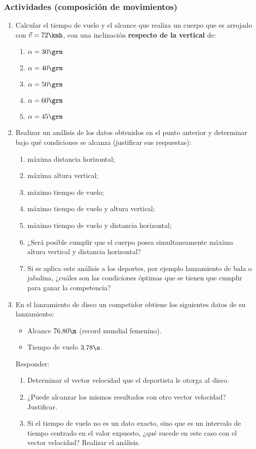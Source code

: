 \subsubsection*{Actividades (composición de movimientos)}
\small
\begin{enumerate}
  \item Calcular el tiempo de vuelo y el alcance que realiza un cuerpo que es
  arrojado con $\vec{v}=72\kmh$, con una inclinación {\bf respecto de la
  vertical} de:
    \begin{enumerate}
      \item $\alpha = 30\grm$
      \item $\alpha = 40\grm$
      \item $\alpha = 50\grm$
      \item $\alpha = 60\grm$
      \item $\alpha = 45\grm$
    \end{enumerate}
  \item Realizar un análisis de los datos obtenidos en el punto anterior y
  determinar bajo qué condiciones se alcanza (justificar sus respuestas):
    \begin{enumerate}
      \item máxima distancia horizontal;
      \item máxima altura vertical;
      \item máximo tiempo de vuelo;
      \item máximo tiempo de vuelo y altura vertical;
      \item máximo tiempo de vuelo y distancia horizontal;
      \item ¿Será posible cumplir que el cuerpo posea simultaneamente máxima
      altura vertical y distancia horizontal?
      \item Si se aplica este análisis a los deportes, por ejemplo lanzamiento
      de bala o jabalina, ¿cuáles son las condiciones óptimas que se tienen que
      cumplir para ganar la competencia?
    \end{enumerate}
  \item En el lanzamiento de disco un competidor obtiene los siguientes datos de
  su lanzamiento:
    \begin{itemize}
      \item Alcance $76.80\m$ (record mundial femenino).
      \item Tiempo de vuelo $3.78\s$.
    \end{itemize}
    Responder:
    \begin{enumerate}
    \item Determinar el vector velocidad que el deportista le otorga al disco.
    \item ¿Puede alcanzar los mismos resultados con otro vector velocidad?
    Justificar.
    \item Si el tiempo de vuelo no es un dato exacto, sino que es un intervalo
    de tiempo centrado en el valor expuesto, ¿qué sucede en este caso con el
    vector velocidad? Realizar el análisis.
    \end{enumerate}
\end{enumerate}
\normalsize


